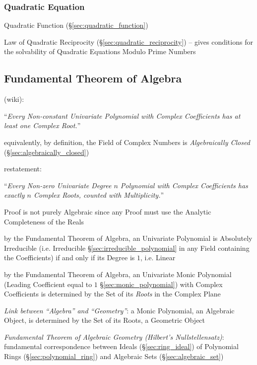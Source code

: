 \subsubsection{Quadratic Equation}\label{sec:quadratic_equation}

Quadratic Function (\S\ref{sec:quadratic_function})

\fist Law of Quadratic Reciprocity (\S\ref{sec:quadratic_reciprocity}) -- gives
conditions for the solvability of Quadratic Equations Modulo Prime Numbers



\subsection{Fundamental Theorem of Algebra}
\label{sec:fundamental_algebra_theorem}

(wiki):

``\emph{Every Non-constant Univariate Polynomial with Complex Coefficients
has at least one Complex Root.}''

equivalently, by definition, the Field of Complex Numbers is
\emph{Algebraically Closed} (\S\ref{sec:algebraically_closed})

restatement:

``\emph{Every Non-zero Univariate Degree $n$ Polynomial with Complex
Coefficients has exactly $n$ Complex Roots, counted with Multiplicity.}''

Proof is not purely Algebraic since any Proof must use the Analytic Completeness
of the Reals

by the Fundamental Theorem of Algebra, an Univariate Polynomial is Absolutely
Irreducible (i.e. Irreducible \S\ref{sec:irreducible_polynomial} in any Field
containing the Coefficients) if and only if its Degree is $1$, i.e. Linear

by the Fundamental Theorem of Algebra, an Univariate Monic Polynomial
(Leading Coefficient equal to $1$ \S\ref{sec:monic_polynomial}) with Complex
Coefficients is determined by the Set of its \emph{Roots} in the Complex Plane

\emph{Link between ``Algebra'' and ``Geometry''}: a Monic Polynomial, an
Algebraic Object, is determined by the Set of its Roots, a Geometric Object

\emph{Fundamental Theorem of Algebraic Geometry (Hilbert's Nullstellensatz)}:
fundamental correspondence between Ideals (\S\ref{sec:ring_ideal}) of Polynomial
Rings (\S\ref{sec:polynomial_ring}) and Algebraic Sets
(\S\ref{sec:algebraic_set})



